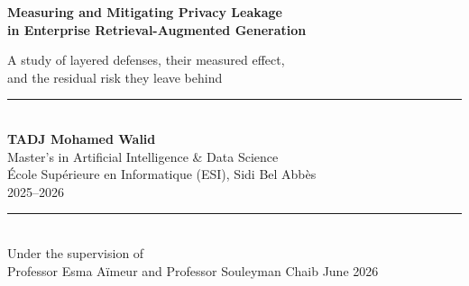 \documentclass[11pt,a4paper]{article}
\title{}\author{}\date{}
\newcommand{\kp}{\ensuremath{\kappa}}
\begin{document}
\begin{titlepage}
\centering
\vspace*{2.2cm}
{\Large\bfseries Measuring and Mitigating Privacy Leakage\\[4pt]
in Enterprise Retrieval-Augmented Generation\par}
\vspace{1.4cm}
{\large A study of layered defenses, their measured effect,\\ and the residual risk they leave behind\par}
\vspace{2.4cm}
{\rule{0.7\textwidth}{0.4pt}}\\[10pt]
{\large\bfseries TADJ Mohamed Walid}\\[6pt]
{\normalsize Master's in Artificial Intelligence \& Data Science}\\
{\normalsize \'Ecole Sup\'erieure en Informatique (ESI), Sidi Bel Abb\`es}\\
{\normalsize 2025--2026}\\[10pt]
{\rule{0.7\textwidth}{0.4pt}}\\[1.2cm]
{\normalsize Under the supervision of\\[2pt]
Professor Esma A\"imeur \quad and \quad Professor Souleyman Chaib}
\vfill
{\normalsize June 2026}
\end{titlepage}

\begin{abstract}
\noindent
Enterprise retrieval-augmented generation (RAG) makes an organization's documents conversationally
accessible, and in the same motion exposes the personal information those documents contain. This
report asks how, and how far, that exposure can be reduced. Working against a corpus of 155 synthetic
but realistic records in which every sensitive entity has been annotated in advance, we assemble a
layered privacy defense and then measure it with two independent instruments: a fast rule-based
detector, and a language-model judge whose agreement with human annotators reaches Cohen's
\kp{}~$=0.827$. The two instruments disagree in a way that turns out to be the most important result
of the work. The detector reports that the full defense removes leakage almost entirely; the validated
judge shows that it does not. Read through the judge, the attack-success rate falls from 28.8\% on the
undefended system to 17.3\% with every layer active, a reduction of roughly forty percent rather than
the near-elimination the detector claims, and one carried almost entirely by redaction of personal
data at retrieval time. What survives is re-identification by linkage: an adversary who assembles a
handful of innocuous facts about a person from separate documents is barely impeded by any redaction
layer. The broader lesson is methodological. Evaluating a RAG privacy defense with a single,
unvalidated detector systematically overstates how well it works. The prototype that accompanies this
study demonstrates the recommended configuration in a live system; it is a demonstration, not a
certified product, and it does not close the linkability gap.
\end{abstract}
\end{document}
